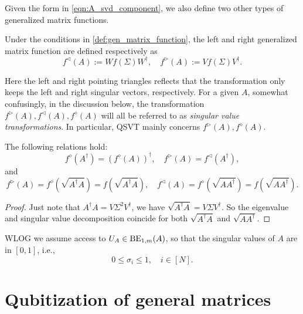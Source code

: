 Given the form in \cref{eqn:A_svd_component}, we also define two other types of generalized matrix functions.

\begin{defn}Under the conditions in \cref{def:gen_matrix_function}, the left and right generalized matrix function are defined respectively as
\begin{equation}
f^{\triangleleft}(A):=Wf(\Sigma)W^{\dag}, \quad 
f^{\triangleright}(A):=Vf(\Sigma)V^{\dag}.
\label{eqn:gen_matrix_function_lr}
\end{equation}
\label{def:gen_matrix_function_lr}
\end{defn}

Here the left and right pointing triangles reflects that the transformation only keeps the left and right singular vectors, respectively.
For a given $A$, somewhat confusingly, in the discussion below, the transformation $f^{\triangleright}(A),f^{\triangleleft}(A),f^{\diamond}(A)$ will all be referred to as \emph{singular value transformations}.
In particular, QSVT mainly concerns $f^{\triangleright}(A),f^{\diamond}(A)$.

\begin{prop}
The following relations hold:
\begin{equation}
f^{\diamond}(A^{\dag})=(f^{\diamond}(A))^{\dag}, \quad f^{\triangleright}(A)=f^{\triangleleft}(A^{\dag}),
\end{equation}
and
\begin{equation}
f^{\triangleright}(A)=f^{\diamond}(\sqrt{A^{\dag}A})=f(\sqrt{A^{\dag}A}), \quad
f^{\triangleleft}(A)=f^{\diamond}(\sqrt{A A^{\dag}})=f(\sqrt{A A^{\dag}}). \end{equation}
\label{prop:gen_mat_func_relation}
\end{prop}
\begin{proof}
Just note that $A^{\dag}A=V\Sigma^2 V^{\dag}$, we have $\sqrt{A^{\dag}A}=V\Sigma V^{\dag}$. So the eigenvalue and singular value decomposition coincide for both $\sqrt{A^{\dag}A}$ and $\sqrt{A A^{\dag}}$.
\end{proof}

WLOG we assume access to $U_A\in\operatorname{BE}_{1,m}(A)$, so that the singular values of $A$ are in $[0,1]$, i.e.,
\begin{equation}
0\le \sigma_i \le 1, \quad i\in[N].
\end{equation}

\section{Qubitization of general matrices}\label{sec:qubitize_general}

